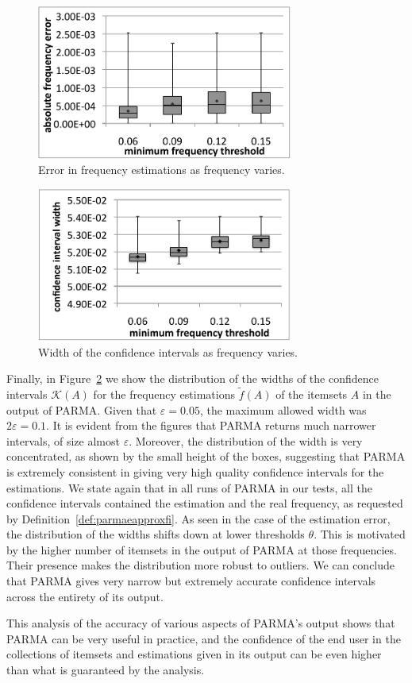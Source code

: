 \begin{figure}[htb]
 \centering
    \includegraphics[width=0.75\textwidth]{parma/absfreqerr}
  \caption{Error in frequency estimations as frequency varies.}
  \label{fig:parmaabsfreqerr}
\end{figure}

\begin{figure}[htb]
 \centering
    \includegraphics[width=0.75\textwidth]{parma/confintwidth}
  \caption{Width of the confidence intervals as frequency varies.}
  \label{fig:parmaconfintwidth}
\end{figure}

Finally, in Figure~\ref{fig:parmaconfintwidth} we show the distribution of the widths
of the confidence intervals $\mathcal{K}(A)$ for the frequency estimations
$\tilde{f}(A)$ of the itemsets $A$ in the output of PARMA. Given that
$\varepsilon=0.05$, the maximum allowed width was $2\varepsilon=0.1$. It is
evident from the figures that PARMA returns much narrower intervals, of size almost
$\varepsilon$. Moreover, the distribution of the width is very concentrated, as
shown by the small height of the boxes, suggesting that PARMA is extremely
consistent in giving very high quality confidence intervals for the estimations.
We state again that in all runs of PARMA in our tests, all the confidence
intervals contained the estimation and the real frequency, as requested by
Definition~\ref{def:parmaeapproxfi}. As seen in the case of the estimation
error, the distribution of the widths shifts down at lower thresholds $\theta$.
This is motivated by the higher number of itemsets in the output of PARMA at
those frequencies. Their presence makes the distribution more robust to
outliers. We can conclude that PARMA gives very narrow but
extremely accurate confidence intervals across the entirety of its output.

This analysis of the accuracy of various aspects of PARMA's output shows that
PARMA can be very useful in practice, and the confidence of the end user in
the collections of itemsets and estimations given in its output can be even higher
than what is guaranteed by the analysis.

